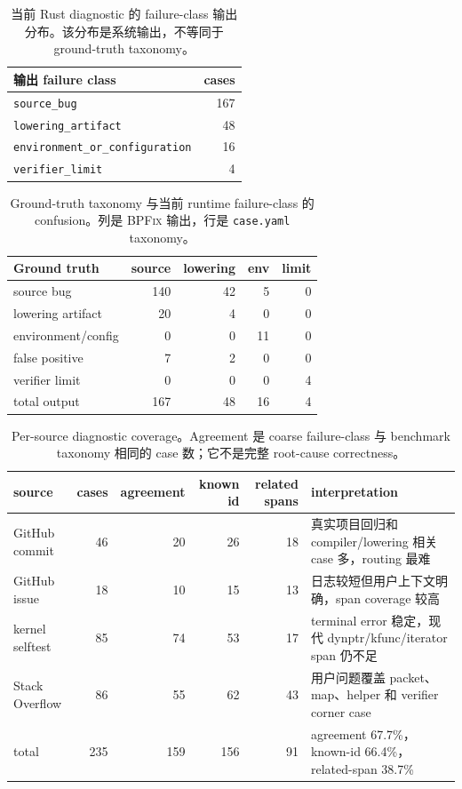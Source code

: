 \documentclass[letterpaper,twocolumn,10pt]{article}
\newcommand{\sys}{\textsc{BPFix}\xspace}
\newcommand{\code}[1]{\texttt{#1}}
\begin{document}
\begin{table}[t]
\centering
\small
\caption{当前 Rust diagnostic 的 failure-class 输出分布。该分布是系统输出，不等同于 ground-truth taxonomy。}
\label{tab:runtime-classes}
\begin{tabular}{lr}
\toprule
输出 failure class & cases \\
\midrule
\code{source\_bug} & 167 \\
\code{lowering\_artifact} & 48 \\
\code{environment\_or\_configuration} & 16 \\
\code{verifier\_limit} & 4 \\
\bottomrule
\end{tabular}
\end{table}

\begin{table}[t]
\centering
\small
\caption{Ground-truth taxonomy 与当前 runtime failure-class 的 confusion。列是 \sys 输出，行是 \code{case.yaml} taxonomy。}
\label{tab:taxonomy-confusion}
\begin{tabular}{lrrrr}
\toprule
Ground truth & source & lowering & env & limit \\
\midrule
source bug & 140 & 42 & 5 & 0 \\
lowering artifact & 20 & 4 & 0 & 0 \\
environment/config & 0 & 0 & 11 & 0 \\
false positive & 7 & 2 & 0 & 0 \\
verifier limit & 0 & 0 & 0 & 4 \\
\midrule
total output & 167 & 48 & 16 & 4 \\
\bottomrule
\end{tabular}
\end{table}

\begin{table}[t]
\centering
\small
\caption{Per-source diagnostic coverage。Agreement 是 coarse failure-class 与 benchmark taxonomy 相同的 case 数；它不是完整 root-cause correctness。}
\label{tab:per-source-coverage}
\begin{tabularx}{\textwidth}{@{}l r r r r X@{}}
\toprule
source & cases & agreement & known id & related spans & interpretation \\
\midrule
GitHub commit & 46 & 20 & 26 & 18 & 真实项目回归和 compiler/lowering 相关 case 多，routing 最难 \\
GitHub issue & 18 & 10 & 15 & 13 & 日志较短但用户上下文明确，span coverage 较高 \\
kernel selftest & 85 & 74 & 53 & 17 & terminal error 稳定，现代 dynptr/kfunc/iterator span 仍不足 \\
Stack Overflow & 86 & 55 & 62 & 43 & 用户问题覆盖 packet、map、helper 和 verifier corner case \\
\midrule
total & 235 & 159 & 156 & 91 & agreement 67.7\%，known-id 66.4\%，related-span 38.7\% \\
\bottomrule
\end{tabularx}
\end{table}
\end{document}
